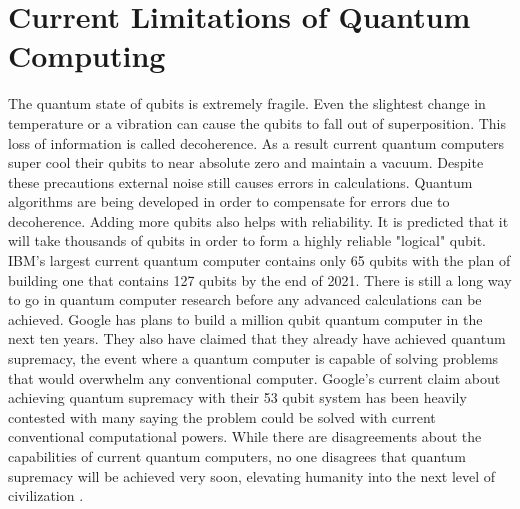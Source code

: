 \documentclass[12pt]{article}   	%
\begin{document}
\section{Current Limitations of Quantum Computing}
The quantum state of qubits is extremely fragile. Even the slightest change in temperature or a vibration can cause the qubits to fall out of superposition. This loss of information is called decoherence. As a result current quantum computers super cool their qubits to near absolute zero and maintain a vacuum. Despite these precautions external noise still causes errors in calculations. Quantum algorithms are being developed  in order to compensate for errors due to decoherence. Adding more qubits also helps with reliability. It is predicted that it will take thousands of qubits in order to form a highly reliable "logical" qubit. IBM's largest current quantum computer contains only 65 qubits with the plan of building one that contains 127 qubits by the end of 2021. There is still a long way to go in quantum computer research before any advanced calculations can be achieved. Google has plans to build a million qubit quantum computer in the next ten years. They also have claimed that they already have achieved quantum supremacy, the event where a quantum computer is capable of solving problems that would overwhelm any conventional computer. Google's current claim about achieving quantum supremacy with their 53 qubit system has been heavily contested with many saying the problem could be solved with current conventional computational powers. While there are disagreements about the capabilities of current quantum computers, no one disagrees that quantum supremacy will be achieved very soon, elevating humanity into the next level of civilization \cite{4SCIMAG}. 


\printbibliography
\end{document}
